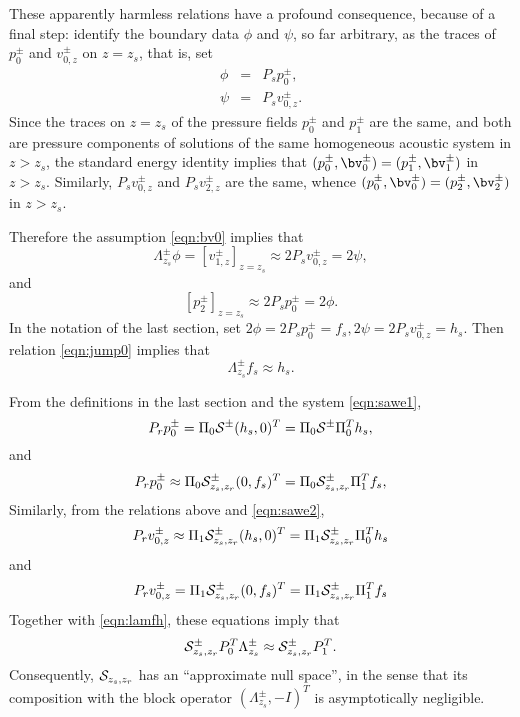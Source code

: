 These apparently harmless relations have a profound consequence,
because of a final step: identify the boundary data $\phi$ and $\psi$,
so far arbitrary, as the traces of $p^{\pm}_0$ and $v^{\pm}_{0,z}$ on $z=z_s$,
that is, set
\begin{eqnarray}
  \phi & = & P_s p^{\pm}_0, \nonumber \\
  \psi & = & P_s v^{\pm}_{0,z}.
             \label{eqn:bv0}
\end{eqnarray}
Since the traces on $z=z_s$ of the pressure fields $p^{\pm}_0$ and $p^{\pm}_1$ are
the same, and both are pressure components of solutions of the same homogeneous
acoustic system in $z>z_s$, the standard energy identity implies that
$(p^{\pm}_0,\bv^{\pm}_0) = (p^{\pm}_1,\bv^{\pm}_1)$ in
$z > z_s$. Similarly, $P_sv^{\pm}_{0,z}$ and $P_sv^{\pm}_{2,z}$ are
the same, whence $(p^{\pm}_0,\bv^{\pm}_0) = (p^{\pm}_2,\bv^{\pm}_2)$ in
$z>z_s$.

Therefore the assumption \ref{eqn:bv0} implies that
\begin{equation}
  \label{eqn:jump0}
  \Lambda^{\pm}_{z_s}\phi = [v^{\pm}_{1,z}]_{z=z_s} \approx 2P_s v^{\pm}_{0,z}  = 2\psi,
\end{equation}
and
\begin{equation}
  \label{eqn:jump1}
[p_2^{\pm}]_{z=z_s} \approx  2P_s p^{\pm}_{0}= 2 \phi.           
\end{equation}
In the notation of the last section, set $2 \phi = 2P_sp^{\pm}_0= f_s,
2\psi = 2P_s v^{\pm}_{0,z}= h_s$. Then relation \ref{eqn:jump0}
implies that
\begin{equation}
  \label{eqn:lamfh}
  \Lambda^{\pm}_{z_s}f_s \approx h_s.
\end{equation}

From the definitions in the last section and the system \ref{eqn:sawe1},
\begin{equation}
  \label{eqn:pident0}
P_r p^{\pm}_0 = \Pi_0{\cal S}^{\pm}(h_s,0)^T = \Pi_0{\cal
  S}^{\pm}\Pi_0^Th_s,
\end{equation}
and
\begin{equation}
  \label{eqn:pident1}
P_r p^{\pm}_0 \approx \Pi_0{\cal S}^{\pm}_{z_s,z_r} (0,f_s)^T = \Pi_0{\cal
  S}^{\pm}_{z_s,z_r} \Pi_1^Tf_s,
\end{equation}
Similarly, from the relations above and \ref{eqn:sawe2},
\begin{equation}
  \label{eqn:vident0}
  P_r  v^{\pm}_{0,z}  \approx \Pi_1{\cal S}^{\pm}_{z_s,z_r}(h_s,0)^T  =
  \Pi_1{\cal S}^{\pm}_{z_s,z_r} \Pi_0^Th_s 
\end{equation}
and
\begin{equation}
  \label{eqn:vident1}
  P_r  v^{\pm}_{0,z}  = \Pi_1{\cal S}^{\pm}_{z_s,z_r}(0,f_s)^T  =
  \Pi_1{\cal S}^{\pm}_{z_s,z_r} \Pi_1^Tf_s 
\end{equation}
Together with \ref{eqn:lamfh}, these equations imply that
\begin{equation}
  \label{eqn:lamnull}
{\cal  S}_{z_s,z_r}^{\pm}P_0^T\Lambda^{\pm}_{z_s} \approx {\cal S}^{\pm}_{z_s,z_r}P_1^T.
\end{equation}
Consequently, ${\cal S}_{z_s,z_r}$ has an ``approximate null space'',
in the sense that its composition with the block operator
$(\Lambda^{\pm}_{z_s},-I)^T$ is asymptotically negligible.

